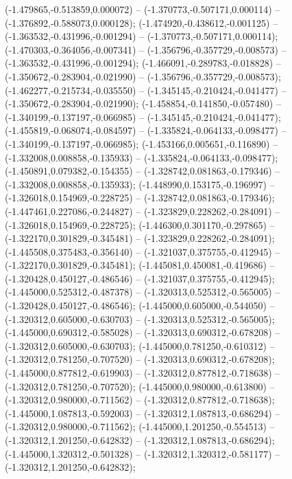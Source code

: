  (-1.479865,-0.513859,0.000072) -- (-1.370773,-0.507171,0.000114) -- (-1.376892,-0.588073,0.000128);
 (-1.474920,-0.438612,-0.001125) -- (-1.363532,-0.431996,-0.001294) -- (-1.370773,-0.507171,0.000114);
 (-1.470303,-0.364056,-0.007341) -- (-1.356796,-0.357729,-0.008573) -- (-1.363532,-0.431996,-0.001294);
 (-1.466091,-0.289783,-0.018828) -- (-1.350672,-0.283904,-0.021990) -- (-1.356796,-0.357729,-0.008573);
 (-1.462277,-0.215734,-0.035550) -- (-1.345145,-0.210424,-0.041477) -- (-1.350672,-0.283904,-0.021990);
 (-1.458854,-0.141850,-0.057480) -- (-1.340199,-0.137197,-0.066985) -- (-1.345145,-0.210424,-0.041477);
 (-1.455819,-0.068074,-0.084597) -- (-1.335824,-0.064133,-0.098477) -- (-1.340199,-0.137197,-0.066985);
 (-1.453166,0.005651,-0.116890) -- (-1.332008,0.008858,-0.135933) -- (-1.335824,-0.064133,-0.098477);
 (-1.450891,0.079382,-0.154355) -- (-1.328742,0.081863,-0.179346) -- (-1.332008,0.008858,-0.135933);
 (-1.448990,0.153175,-0.196997) -- (-1.326018,0.154969,-0.228725) -- (-1.328742,0.081863,-0.179346);
 (-1.447461,0.227086,-0.244827) -- (-1.323829,0.228262,-0.284091) -- (-1.326018,0.154969,-0.228725);
 (-1.446300,0.301170,-0.297865) -- (-1.322170,0.301829,-0.345481) -- (-1.323829,0.228262,-0.284091);
 (-1.445508,0.375483,-0.356140) -- (-1.321037,0.375755,-0.412945) -- (-1.322170,0.301829,-0.345481);
 (-1.445081,0.450081,-0.419686) -- (-1.320428,0.450127,-0.486546) -- (-1.321037,0.375755,-0.412945);
 (-1.445000,0.525312,-0.487378) -- (-1.320313,0.525312,-0.565005) -- (-1.320428,0.450127,-0.486546);
 (-1.445000,0.605000,-0.544050) -- (-1.320312,0.605000,-0.630703) -- (-1.320313,0.525312,-0.565005);
 (-1.445000,0.690312,-0.585028) -- (-1.320313,0.690312,-0.678208) -- (-1.320312,0.605000,-0.630703);
 (-1.445000,0.781250,-0.610312) -- (-1.320312,0.781250,-0.707520) -- (-1.320313,0.690312,-0.678208);
 (-1.445000,0.877812,-0.619903) -- (-1.320312,0.877812,-0.718638) -- (-1.320312,0.781250,-0.707520);
 (-1.445000,0.980000,-0.613800) -- (-1.320312,0.980000,-0.711562) -- (-1.320312,0.877812,-0.718638);
 (-1.445000,1.087813,-0.592003) -- (-1.320312,1.087813,-0.686294) -- (-1.320312,0.980000,-0.711562);
 (-1.445000,1.201250,-0.554513) -- (-1.320312,1.201250,-0.642832) -- (-1.320312,1.087813,-0.686294);
 (-1.445000,1.320312,-0.501328) -- (-1.320312,1.320312,-0.581177) -- (-1.320312,1.201250,-0.642832);

